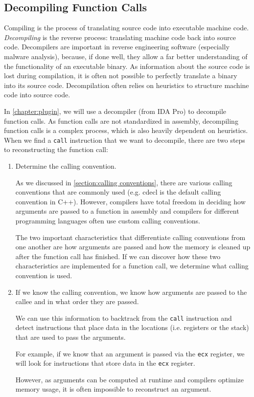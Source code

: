 \subsection{Decompiling Function Calls}\label{section:decompiling function calls}
Compiling is the process of translating source code into executable machine code. \emph{Decompiling} is the reverse process: translating machine code back into source code. Decompilers are important in reverse engineering software (especially malware analysis), because, if done well, they allow a far better understanding of the functionality of an executable binary. As information about the source code is lost during compilation, it is often not possible to perfectly translate a binary into its source code. Decompilation often relies on heuristics to structure machine code into source code.

\medskip

In \autoref{chapter:plugin}, we will use a decompiler (from IDA Pro) to decompile function calls. As function calls are not standardized in assembly, decompiling function calls is a complex process, which is also heavily dependent on heuristics. When we find a \texttt{call} instruction that we want to decompile, there are two steps to reconstructing the function call:
\begin{enumerate}
    \item Determine the calling convention.

    As we discussed in \autoref{section:calling conventions}, there are various calling conventions that are commonly used (e.g. cdecl is the default calling convention in C++). However, compilers have total freedom in deciding how arguments are passed to a function in assembly and compilers for different programming languages often use custom calling conventions.

    The two important characteristics that differentiate calling conventions from one another are how arguments are passed and how the memory is cleaned up after the function call has finished. If we can discover how these two characteristics are implemented for a function call, we determine what calling convention is used.

    \item If we know the calling convention, we know how arguments are passed to the callee and in what order they are passed.

    We can use this information to backtrack from the \texttt{call} instruction and detect instructions that place data in the locations (i.e. registers or the stack) that are used to pass the arguments.

    For example, if we know that an argument is passed via the \texttt{ecx} register, we will look for instructions that store data in the \texttt{ecx} register.

    However, as arguments can be computed at runtime and compilers optimize memory usage, it is often impossible to reconstruct an argument.
\end{enumerate}


